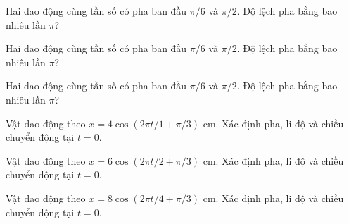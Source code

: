 \begin{ex}
Hai dao động cùng tần số có pha ban đầu $\pi/6$ và $\pi/2.$ Độ lệch pha bằng bao nhiêu lần $\pi$?
\end{ex}

\begin{ex}
Hai dao động cùng tần số có pha ban đầu $\pi/6$ và $\pi/2.$ Độ lệch pha bằng bao nhiêu lần $\pi$?
\end{ex}

\begin{ex}
Hai dao động cùng tần số có pha ban đầu $\pi/6$ và $\pi/2.$ Độ lệch pha bằng bao nhiêu lần $\pi$?
\end{ex}

\begin{ex}
Vật dao động theo $x=4\cos(2\pi t/1+\pi/3)$ cm. Xác định pha, li độ và chiều chuyển động tại $t=0$.
\choiceTF

\end{ex}

\begin{ex}
Vật dao động theo $x=6\cos(2\pi t/2+\pi/3)$ cm. Xác định pha, li độ và chiều chuyển động tại $t=0$.
\choiceTF

\end{ex}

\begin{ex}
Vật dao động theo $x=8\cos(2\pi t/4+\pi/3)$ cm. Xác định pha, li độ và chiều chuyển động tại $t=0$.
\choiceTF

\end{ex}

